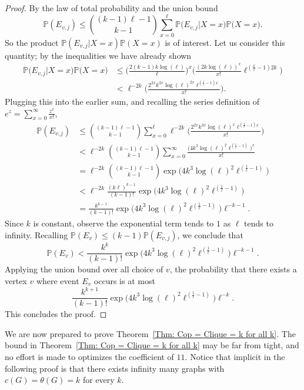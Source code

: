 \documentclass[12pt]{amsart}
\theoremstyle{definition}
\begin{document}
\begin{proof}
    By the law of total probability and the union bound 
    \[
     \mathbb{P}( E_{v,j}) \leq \binom{(k-1)\ell-1}{k-1} \sum_{x=0}^\ell \mathbb{P}\Big( E_{v,j} | X = x\Big)\mathbb{P}\Big(X = x\Big).
    \]
    So the product $\mathbb{P}( E_{v,j} | X = x)\mathbb{P}(X = x)$ is of interest.
    Let us consider this quantity; by the inequalities we have already shown
    \begin{align*}
        \mathbb{P}\Big( E_{v,j} | X = x\Big)\mathbb{P}\Big(X = x\Big) & \leq \Bigg(\frac{2(k-1)k\log(\ell)}{\ell} \Bigg)^x \Bigg(\frac{(2k\log(\ell))^x}{x!}\ell^{(\frac{x}{\ell}-1)2k} \Bigg) \\
        & < \ell^{-2k}\Bigg(\frac{2^{2x} k^{3x} \log(\ell)^{2x} \ell^{(\frac{1}{\ell}-1)x}}{x!} \Bigg).
    \end{align*}
    Plugging this into the earlier sum, and recalling the series definition of $e^z = \sum_{x=0}^\infty \frac{z^x}{x!}$,
    \begin{align*}
        \mathbb{P}( E_{v,j}) & \leq \binom{(k-1)\ell-1}{k-1} \sum_{x=0}^\ell \ell^{-2k}\Bigg(\frac{2^{2x} k^{3x} \log(\ell)^x \ell^{(\frac{1}{\ell}-1)x}}{x!} \Bigg) \\
        & < \ell^{-2k} \binom{(k-1)\ell-1}{k-1}  \sum_{x=0}^\infty \frac{\Big(4 k^{3} \log(\ell)^2 \ell^{(\frac{1}{\ell}-1)}\Big)^x}{x!} \\
        & = \ell^{-2k} \binom{(k-1)\ell-1}{k-1} \exp\Big(4 k^{3} \log(\ell)^2 \ell^{(\frac{1}{\ell}-1)}\Big) \\
        & < \ell^{-2k} \frac{(k\ell)^{k-1}}{(k-1)!} \exp\Big(4 k^{3} \log(\ell)^2 \ell^{(\frac{1}{\ell}-1)}\Big) \\
        & = \frac{k^{k-1}}{(k-1)!}\exp\Big(4 k^{3} \log(\ell)^2 \ell^{(\frac{1}{\ell}-1)}\Big)\ell^{-k-1}.
    \end{align*}
    Since $k$ is constant,
    observe the exponential term tends to $1$ as $\ell$ tends to infinity.
    Recalling $\mathbb{P}(E_v) \leq (k-1)\mathbb{P}(E_{v,j})$,
    we conclude that 
    \[
    \mathbb{P}(E_v) < \frac{k^{k}}{(k-1)!}\exp\Big(4 k^{3} \log(\ell)^2 \ell^{(\frac{1}{\ell}-1)}\Big)\ell^{-k-1}.
    \]
    Applying the union bound over all choice of $v$,
    the probability that there exists a vertex $v$ where event $E_v$ occurs is at most 
    \[
    \frac{k^{k+1}}{(k-1)!}\exp\Big(4 k^{3} \log(\ell)^2 \ell^{(\frac{1}{\ell}-1)}\Big)\ell^{-k}.
    \]
    This concludes the proof.
\end{proof}



We are now prepared to prove Theorem~\ref{Thm: Cop = Clique = k for all k}.
The bound  in Theorem~\ref{Thm: Cop = Clique = k for all k} may be far from tight, and no effort is made to optimizes the coefficient of $11$.
Notice that implicit in the following proof is that there exists infinity many graphs with $c(G) = \theta(G) = k$ for every $k$.
\end{document}
